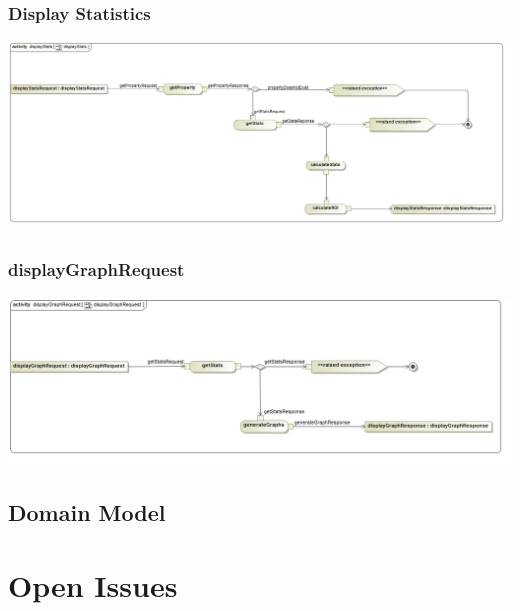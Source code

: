 \documentclass[a4paper,12pt]{article}
\begin{document}
\subsubsection{Display Statistics}
\includegraphics[width=1\textwidth]{./Images/processSpecification/displayStatsActivity.jpg}
\subsubsection{displayGraphRequest}
\includegraphics[width=1\textwidth]{./Images/processSpecification/displayGraphRequestActivity.jpg}


\subsection{Domain Model}

\newpage
\section{Open Issues}
\end{document}
